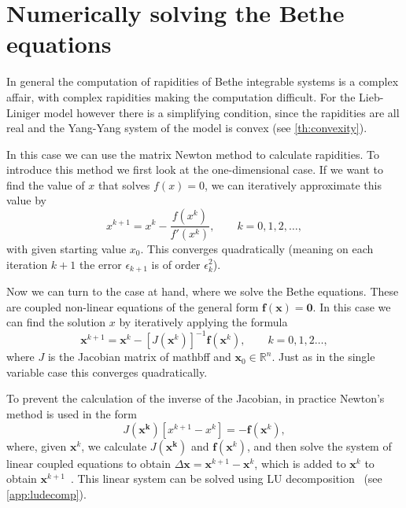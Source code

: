 \documentclass[11pt, a4paper]{report} %
\begin{document}
\section{Numerically solving the Bethe equations}\label{sec:numer-solv-bethe}

In general the computation of rapidities of Bethe integrable systems is a complex affair, with complex rapidities making the computation difficult.
For the Lieb-Liniger model however there is a simplifying condition, since the rapidities are all real and the Yang-Yang system of the model is convex (see \cref{th:convexity}).

In this case we can use the matrix Newton method to calculate rapidities.
To introduce this method we first look at the one-dimensional case.
If we want to find the value of \(x\) that solves \(f(x)=0\), we can iteratively approximate this value by 
\begin{equation}
  x^{k+1} = x^k - \frac{f(x^k)}{f'(x^k)}, \qquad k = 0, 1, 2, \ldots,
\end{equation}
with given starting value \(x_0\).
This converges quadratically (meaning on each iteration \(k+1\) the error \(\epsilon_{k+1}\) is of order \(\epsilon_k^2\)).

Now we can turn to the case at hand, where we solve the Bethe equations.
These are coupled non-linear equations of the general form \(\mathbf{f(x)=0}\).
In this case we can find the solution \(x\) by iteratively applying the formula
\begin{equation}
  \mathbf{x}^{k+1} = \mathbf{x}^k - {[J(\mathbf{x}^k)]}^{-1}\mathbf{f}(\mathbf{x}^k), \qquad k=0,1,2\ldots,
\end{equation}
where \(J\) is the Jacobian matrix of mathbf{f}\) and \(\mathbf{x}_0 \in \mathbb{R}^n\).
Just as in the single variable case this converges quadratically.

To prevent the calculation of the inverse of the Jacobian, in practice Newton's method is used in the form
\begin{equation}\label{eq:practicalnewton}
  J(\mathbf{x^k})[x^{k+1} - x^k] = - \mathbf{f}(\mathbf{x}^k),
\end{equation}
where, given \(\mathbf{x}^k\), we calculate \(J(\mathbf{x^k})\) and \( \mathbf{f}(\mathbf{x}^k)\), and then solve the system of linear coupled equations to obtain \(\Delta\mathbf{x}=\mathbf{x}^{k+1} - \mathbf{x}^k\), which is added to \(\mathbf{x}^k\) to obtain \(\mathbf{x}^{k+1}\)~\cite{Sueli2003}. 
This linear system can be solved using LU decomposition~\cite{Press2007} (see \cref{app:ludecomp}).
\end{document}
